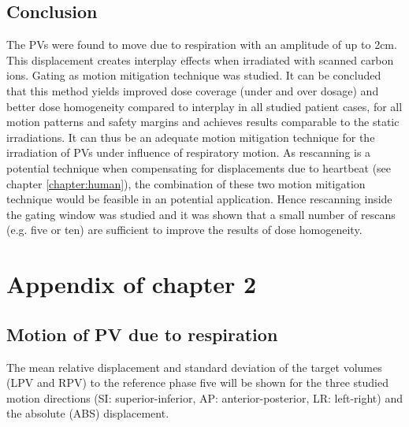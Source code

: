 \documentclass[type=dr, dr=rernat, accentcolor=tud7b,colorbacktitle, bigchapter, openright, twoside, 12pt ]{tudthesis}
\begin{document}
\section{Conclusion}

The PVs were found to move due to respiration with an amplitude of up to 2cm. 
This displacement creates interplay effects when irradiated with scanned carbon ions. Gating as motion mitigation technique was studied. 
It can be concluded that this method yields improved dose coverage (under and over dosage) and better dose homogeneity compared to interplay 
in all studied patient cases, for all motion patterns and safety margins and achieves results comparable to the static irradiations. 
It can thus be an adequate motion mitigation technique for the irradiation of PVs under influence of respiratory motion. 
As rescanning is a potential technique when compensating for displacements due to 
heartbeat (see chapter \ref{chapter:human}), the combination of these two motion mitigation technique would be feasible in an potential 
application. Hence rescanning inside the gating window was studied and it was shown that a  small number of rescans (e.g. five or ten) are 
sufficient to improve the results of dose homogeneity. 




\appendix

\chapter{Appendix of chapter 2}
\label{app:mdacc}

\section{Motion of PV due to respiration}
\label{app:mdacc:motion}

The mean relative displacement and standard deviation of the target volumes (LPV and RPV) to the reference phase five will be shown for the 
three studied motion directions (SI: superior-inferior, AP: anterior-posterior, LR: left-right) and the absolute (ABS) displacement. 
\end{document}
